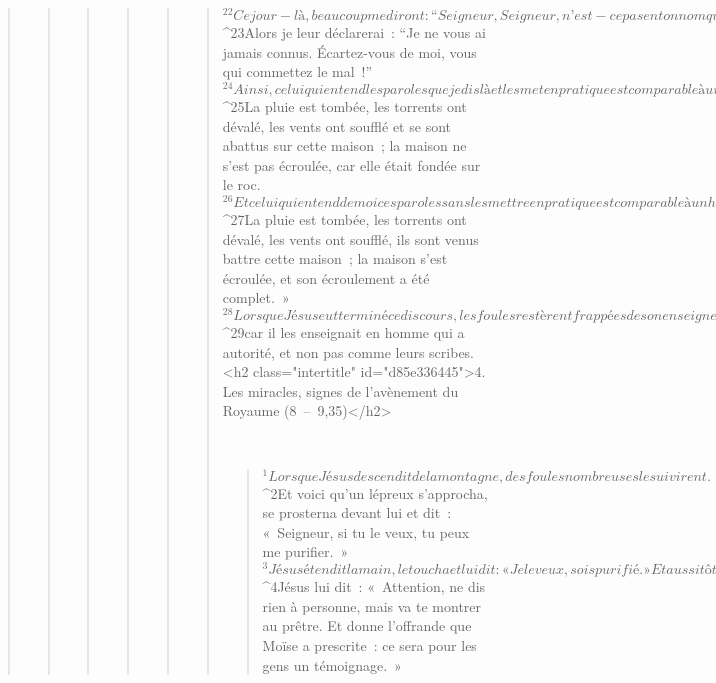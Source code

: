 \begin{verse}
\begin{verse}
\begin{verse}
\begin{verse}
\begin{verse}
\begin{verse}
${}^{22}Ce jour-là, beaucoup me diront : “Seigneur, Seigneur, n’est-ce pas en ton nom que nous avons prophétisé, en ton nom que nous avons expulsé les démons, en ton nom que nous avons fait beaucoup de miracles ?” 
${}^{23}Alors je leur déclarerai : “Je ne vous ai jamais connus. Écartez-vous de moi, vous qui commettez le mal !”
${}^{24}Ainsi, celui qui entend les paroles que je dis là et les met en pratique est comparable à un homme prévoyant qui a construit sa maison sur le roc. 
${}^{25}La pluie est tombée, les torrents ont dévalé, les vents ont soufflé et se sont abattus sur cette maison ; la maison ne s’est pas écroulée, car elle était fondée sur le roc. 
${}^{26}Et celui qui entend de moi ces paroles sans les mettre en pratique est comparable à un homme insensé qui a construit sa maison sur le sable. 
${}^{27}La pluie est tombée, les torrents ont dévalé, les vents ont soufflé, ils sont venus battre cette maison ; la maison s’est écroulée, et son écroulement a été complet. »
${}^{28}Lorsque Jésus eut terminé ce discours, les foules restèrent frappées de son enseignement, 
${}^{29}car il les enseignait en homme qui a autorité, et non pas comme leurs scribes.
      <h2 class="intertitle" id="d85e336445">4. Les miracles, signes de l’avènement du Royaume (8 – 9,35)</h2>
      
         
      \bchapter{}
      \begin{verse}
${}^{1}Lorsque Jésus descendit de la montagne, des foules nombreuses le suivirent. 
${}^{2}Et voici qu’un lépreux s’approcha, se prosterna devant lui et dit : « Seigneur, si tu le veux, tu peux me purifier. » 
${}^{3}Jésus étendit la main, le toucha et lui dit : « Je le veux, sois purifié. » Et aussitôt il fut purifié de sa lèpre. 
${}^{4}Jésus lui dit : « Attention, ne dis rien à personne, mais va te montrer au prêtre. Et donne l’offrande que Moïse a prescrite : ce sera pour les gens un témoignage. »
      

\end{verse}
\end{verse}
\end{verse}
\end{verse}
\end{verse}
\end{verse}
\end{verse}
